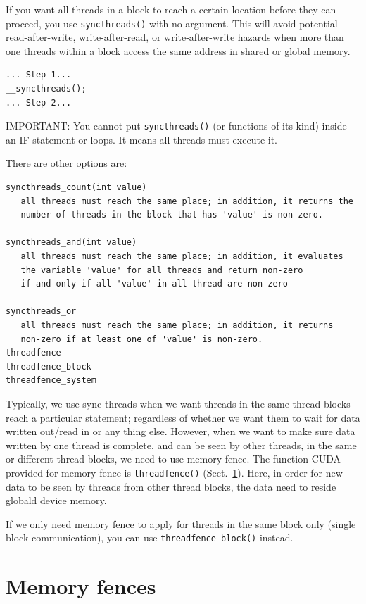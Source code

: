 If you want all threads in a block to reach a certain location before
they can proceed, you use \verb!syncthreads()! with no argument. This
will avoid potential read-after-write, write-after-read, or
write-after-write hazards when more than one threads within a block
access the same address in shared or global memory.
\begin{lstlisting}
... Step 1...
__syncthreads();
... Step 2...
\end{lstlisting}

IMPORTANT: You cannot put \verb!syncthreads()! (or functions of its
kind) inside an IF statement or loops. It means all threads must
execute it. 

There are other options are:
\begin{lstlisting}
syncthreads_count(int value)
   all threads must reach the same place; in addition, it returns the
   number of threads in the block that has 'value' is non-zero.
   
syncthreads_and(int value) 
   all threads must reach the same place; in addition, it evaluates
   the variable 'value' for all threads and return non-zero
   if-and-only-if all 'value' in all thread are non-zero
   
syncthreads_or
   all threads must reach the same place; in addition, it returns
   non-zero if at least one of 'value' is non-zero.
threadfence
threadfence_block
threadfence_system
\end{lstlisting}

Typically, we use sync threads when we want threads in the same thread
blocks reach a particular statement; regardless of whether we want them to wait
for data written out/read in or any thing else. However, when we want to make
sure data written by one thread is complete, and can be seen by other threads,
in the same or different thread blocks, we need to use memory fence. The function CUDA
provided for memory fence is \verb!threadfence()!
(Sect.~\ref{sec:memory-fences}). Here, in
order for new data to be seen by threads from other thread blocks, the data
need to reside globald device memory.

If we only need memory fence to apply for threads in the same block only (single
block communication), you can use \verb!threadfence_block()! instead.


\section{Memory fences}
\label{sec:memory-fences}

